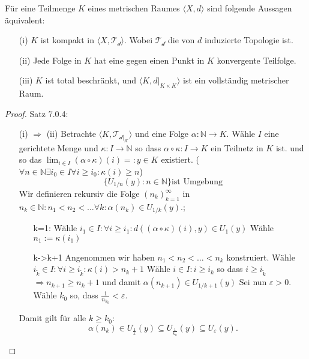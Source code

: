 \thm{}
{
Für eine Teilmenge $K$ eines metrischen Raumes $\langle X, d \rangle$ sind folgende Aussagen äquivalent:
\begin{itemize}
    \item[(i)] $K$ ist kompakt in $\langle X, \mathcal{T_d} \rangle$.
    Wobei $\mathcal{T_d}$ die von $d$ induzierte Topologie ist.
    \item[(ii)] Jede Folge in $K$ hat eine gegen einen Punkt in $K$ konvergente Teilfolge.
    \item[(iii)] $K$ ist total beschränkt, und $\langle K, d|_{K \times K} \rangle$ 
    ist ein vollständig metrischer Raum.
\end{itemize}
}

\begin{proof}{Satz 7.0.4:}\\
    \begin{itemize}
        \item[(i) $\Rightarrow$ (ii)] 
        Betrachte $\langle K, \mathcal{T_{d|_K }}\rangle$ und eine Folge $\alpha: \mathbb{N} \to K$.
        Wähle $I$ eine gerichtete Menge und $\kappa: I \to \mathbb{N}$
        so dass $\alpha \circ \kappa : I \to K$ ein Teilnetz in $K$ ist.
        und so das $\lim_{i \in I} (\alpha \circ \kappa)(i) = : y \in K$ existiert.
        ($\forall n \in \mathbb{N} \exists i_0 \in I \forall i \geq i_0:  \kappa(i) \geq n$)
        $$
        \{U_{1/n}(y) : n \in \mathbb{N}\} \text{ist Umgebung}
        $$
        Wir definieren rekursiv die Folge $(n_k)_{k=1}^{\infty}$ in $n_k \in \mathbb{N}: n_1 < n_2 < \ldots
        \forall k : \alpha(n_k) \in U_{1/k}(y)$.;
        \begin{itemize}
            \item[k=1:] Wähle $i_1 \in I: \forall i \geq i_1 : d((\alpha \circ \kappa)(i), y) \in U_1(y)$
            Wähle $n_1 := \kappa(i_1)$
            \item[k->k+1] Angenommen wir haben $n_1 < n_2 < \ldots < n_k$ konstruiert.
            Wähle $i_{\tilde{k}} \in I: \forall i \geq i_{\tilde{k}} : \kappa(i) > n_k+1$
            Wähle $i \in I: i \geq i_k$ so dass $i \geq i_{\tilde{k}}$
            $\Rightarrow n_{k+1}\geq n_k+1$ und damit $\alpha(n_{k+1})\in U_{1/k+1}(y)$
            Sei nun $\varepsilon > 0$.  
            Wähle $k_0$ so, dass $\frac{1}{n_{k_0}} < \varepsilon$.  
        \end{itemize}
        Damit gilt für alle $k \geq k_0$:
        $$
        \alpha(n_k) \in U_{\frac{1}{k}}(y) \subseteq U_{\frac{1}{k_0}}(y) \subseteq U_{\varepsilon}(y).
        $$


\end{itemize}
\end{proof}
